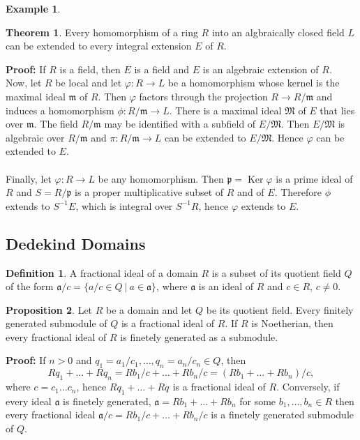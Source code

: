 \documentclass[11pt]{amsbook}%
\theoremstyle{plain}
\theoremstyle{definition}
\newtheorem{definition*}{Definition}
\newtheorem*{example*}{Example}
\newtheorem{proposition}[theorem]{Proposition}
\newtheorem{theorem}{Theorem}
\numberwithin{equation}{section}
\newcommand{\af}{\mathfrak a}
\newcommand{\mf}{\mathfrak m}
\newcommand{\MF}{\mathfrak M}
\newcommand{\pf}{\mathfrak p}
\renewcommand{\proof}{ \textbf{Proof: }}
\DeclareMathOperator{\Ker}{Ker}
\begin{document}
\begin{example*}
\begin{theorem}
  Every homomorphism of a ring $R$ into an algbraically closed field $L$ can be extended to every
  integral extension $E$ of $R$.
\end{theorem} \vspace{1.8em}
\proof If $R$ is a field, then $E$ is a field and $E$ is an algebraic extension of $R$. \\
Now, let $R$ be local and let $\varphi: R \longrightarrow L$ be a homomorphism whose kernel
is the maximal ideal $\mf$ of $R$. Then $\varphi$ factors through the projection $R \longrightarrow R/\mf$
and induces a homomorphism $\phi: R/\mf \longrightarrow L$. There is a maximal ideal $\MF$ of $E$
that lies over $\mf$. The field $R/\mf$ may be identified with a subfield of $E/\MF$.
Then $E/\MF$ is algebraic over $R/\mf$ and $\pi: R/\mf \longrightarrow L$ can be extended to $E/\MF$.
Hence $\varphi$ can be extended to $E$. \\ \\
Finally, let $\varphi: R \longrightarrow L$ be any homomorphism. Then $\pf = \Ker \varphi$ is a
prime ideal of $R$ and $S = R/\pf$ is a proper multiplicative subset of $R$ and of $E$.
Therefore $\phi$ extends to $S^{-1}E$, which is integral over $S^{-1}R$, hence $\varphi$
extends to $E$. \qedsymbol

\subsection{Dedekind Domains}
\begin{definition*}
  \label{def-fractional-ideal}
  A fractional ideal of a domain $R$ is a subset of its quotient field $Q$ of the form $\af/c = \{a/c \in Q \ | \ a \in \af\}$,
  where $\af$ is an ideal of $R$ and $c \in R$, $c \neq 0$.
\end{definition*}

\begin{proposition}
  Let $R$ be a domain and let $Q$ be its quotient field. Every finitely generated submodule
  of $Q$ is a fractional ideal of $R$. If $R$ is Noetherian, then every fractional ideal
  of $R$ is finetely generated as a submodule.
\end{proposition} \vspace{1.8em}
\proof If $n > 0$ and $q_{1} = a_{1}/c_{1}, \dots, q_{n} = a_{n}/c_{n} \in Q$, then
$$
Rq_{1} + \dots + Rq_{n} = Rb_{1}/c + \dots + Rb_{n}/c = (Rb_{1} + \dots + Rb_{n})/c,
$$
where $c = c_{1} \dots c_{n}$, hence $Rq_{1} + \dots + Rq_{}$ is a fractional ideal of $R$. Conversely,
if every ideal $\af$ is finetely generated, $\af = Rb_{1} + \dots + Rb_{n}$ for some
$b_{1}, \dots, b_{n} \in R$ then every fractional ideal $\af/c = Rb_{1}/c + \dots + Rb_{n}/c$ is a
finetely generated  submodule of $Q$.


\end{example*}
\end{document}
